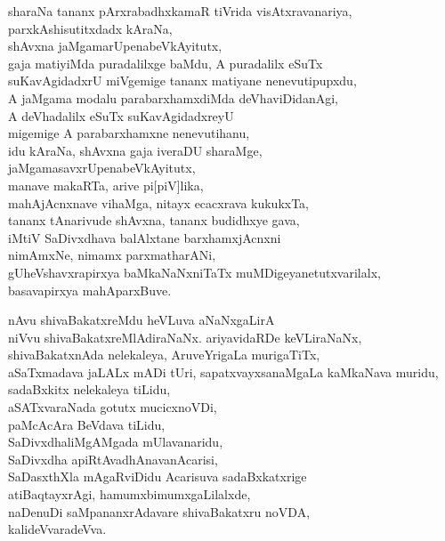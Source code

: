 \begin{entry}
\begin{shl}
sharaNa tananx pArxrabadhxkamaR tiVrida visAtxravanariya,\\
parxkAshisutitxdadx kAraNa,\\
shAvxna jaMgamarUpenabeVkAyitutx,\\
gaja matiyiMda puradalilxge baMdu, A puradalilx eSuTx\\
suKavAgidadxrU miVgemige tananx matiyane nenevutipupxdu,\\
A jaMgama modalu parabarxhamxdiMda deVhaviDidanAgi,\\
A deVhadalilx eSuTx suKavAgidadxreyU\\
migemige A parabarxhamxne nenevutihanu,\\
idu kAraNa, shAvxna gaja iveraDU sharaMge,\\
jaMgamasavxrUpenabeVkAyitutx,\\
manave makaRTa, arive pi[piV]lika,\\
mahAjAcnxnave vihaMga, nitayx ecacxrava kukukxTa,\\
tananx tAnarivude shAvxna, tananx budidhxye gava,\\
iMtiV SaDivxdhava balAlxtane barxhamxjAcnxni\\
nimAmxNe, nimamx parxmatharANi,\\
gUheVshavxrapirxya baMkaNaNxniTaTx muMDigeyanetutxvarilalx,\\
basavapirxya mahAparxBuve.
\end{shl}
\end{entry}

\begin{entry}
\begin{shl}
nAvu shivaBakatxreMdu heVLuva aNaNxgaLirA\\
niVvu shivaBakatxreMlAdiraNaNx. ariyavidaRDe keVLiraNaNx,\\
shivaBakatxnAda nelekaleya, AruveYrigaLa murigaTiTx,\\
aSaTxmadava jaLALx mADi tUri, sapatxvayxsanaMgaLa kaMkaNava muridu,\\
sadaBxkitx nelekaleya tiLidu,\\
aSATxvaraNada gotutx mucicxnoVDi,\\
paMcAcAra BeVdava tiLidu,\\
SaDivxdhaliMgAMgada mUlavanaridu,\\
SaDivxdha apiRtAvadhAnavanAcarisi,\\
SaDasxthXla mAgaRviDidu Acarisuva sadaBxkatxrige\\
atiBaqtayxrAgi, hamumxbimumxgaLilalxde,\\
naDenuDi saMpananxrAdavare shivaBakatxru noVDA,\\
kalideVvaradeVva.
\end{shl}
\end{entry}

